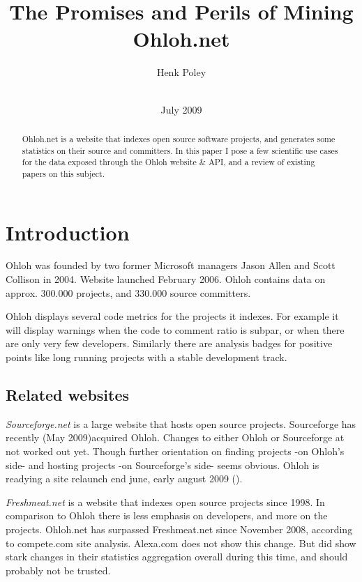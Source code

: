 \documentclass{sig-alternate}
\begin{document}
\toappear{} %

\title{The Promises and Perils of Mining Ohloh.net}

\author{
\alignauthor Henk Poley\\
  \\
}

\date{July 2009}


\maketitle

\begin{abstract}
Ohloh.net is a website that indexes open source software projects, and generates some statistics on their source and committers. In this paper I pose a few scientific use cases for the data exposed through the Ohloh website \& API, and a review of existing papers on this subject.
\end{abstract}


\section{Introduction}
Ohloh was founded by two former Microsoft managers Jason Allen and Scott Collison in 2004. Website launched February 2006. Ohloh contains data on approx. 300.000 projects, and 330.000 source committers.

Ohloh displays several code metrics for the projects it indexes. For example it will display warnings when the code to comment ratio is subpar, or when there are only very few developers. Similarly there are analysis badges for positive points like long running projects with a stable development track.


\subsection{Related websites}
\emph{Sourceforge.net} is a large website that hosts open source projects. Sourceforge has recently (May 2009)acquired Oh\-loh. Changes to either Ohloh or Sourceforge at not worked out yet. Though further orientation on finding projects -on Ohloh's side- and hosting projects -on Sourceforge's side- seems obvious. Ohloh is readying a site relaunch end june, early august 2009 (\cite{behind-the-scenes}).

\emph{Freshmeat.net} is a website that indexes open source pro\-jects since 1998. In comparison to Ohloh there is less emphasis on developers, and more on the projects. Ohloh.net has surpassed Freshmeat.net since November 2008, according to compete.com site analysis. Alexa.com does not show this change. But did show stark changes in their statistics aggregation overall during this time, and should probably not be trusted.
\end{document}
